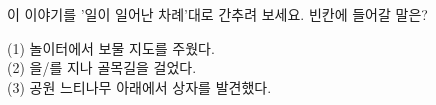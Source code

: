 \documentclass[fs13,seriesSau]{korfarm-base}
\begin{document}
\kfActivityBg \par{}\par\nopagebreak[4]\smallskip\nopagebreak[4]
\begin{kfBlankList}
\kfBlankItem 이 이야기를 '일이 일어난 차례'대로 간추려 보세요. 빈칸에 들어갈 말은?
\begin{kfEvidence}(1) 놀이터에서 보물 지도를 주웠다. \\\relax
(2) \kfFillBlank[12mm]{}을/를 지나 골목길을 걸었다. \\\relax
(3) 공원 느티나무 아래에서 상자를 발견했다.\end{kfEvidence}
\end{kfBlankList}

\kfActivityBg \par{}\par\nopagebreak[4]\smallskip\nopagebreak[4]

\end{document}
